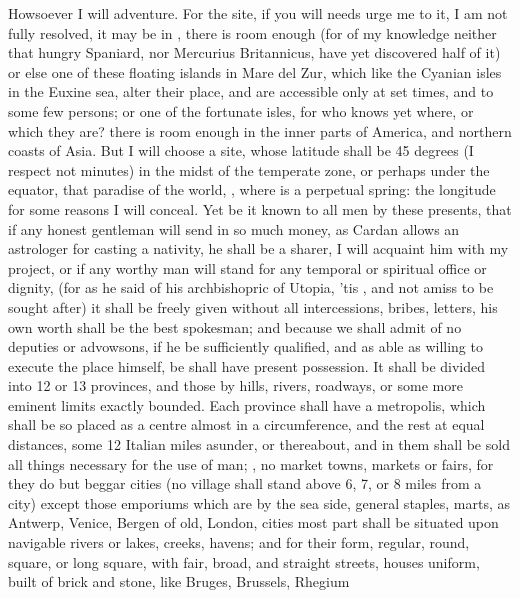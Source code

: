 {Howsoever I will adventure. For the site, if you will needs urge me to
it, I am not fully resolved, it may be in ,
there is room enough (for of my knowledge neither that hungry Spaniard,
nor Mercurius Britannicus, have yet discovered half of it) or else
one of these floating islands in Mare del Zur, which like the Cyanian
isles in the Euxine sea, alter their place, and are accessible only at
set times, and to some few persons; or one of the fortunate isles, for
who knows yet where, or which they are? there is room enough in the
inner parts of America, and northern coasts of Asia. But I will choose
a site, whose latitude shall be 45 degrees (I respect not minutes) in
the midst of the temperate zone, or perhaps under the equator, that
paradise of the world, , \etc{} where is a
perpetual spring: the longitude for some reasons I will conceal. Yet be
it known to all men by these presents, that if any honest gentleman
will send in so much money, as Cardan allows an astrologer for casting
a nativity, he shall be a sharer, I will acquaint him with my project,
or if any worthy man will stand for any temporal or spiritual office or
dignity, (for as he said of his archbishopric of Utopia, 'tis , and not amiss to be sought after) it shall be freely given
without all intercessions, bribes, letters, \etc{} his own worth shall be
the best spokesman; and because we shall admit of no deputies or
advowsons, if he be sufficiently qualified, and as able as willing to
execute the place himself, be shall have present possession. It shall
be divided into 12 or 13 provinces, and those by hills, rivers,
roadways, or some more eminent limits exactly bounded. Each province
shall have a metropolis, which shall be so placed as a centre almost in
a circumference, and the rest at equal distances, some 12 Italian miles
asunder, or thereabout, and in them shall be sold all things necessary
for the use of man; , no market towns, markets or
fairs, for they do but beggar cities (no village shall stand above 6,
7, or 8 miles from a city) except those emporiums which are by the sea
side, general staples, marts, as Antwerp, Venice, Bergen of old,
London, \etc{} cities most part shall be situated upon navigable rivers or
lakes, creeks, havens; and for their form, regular, round, square, or
long square, with fair, broad, and straight streets, houses
uniform, built of brick and stone, like Bruges, Brussels, Rhegium
}
